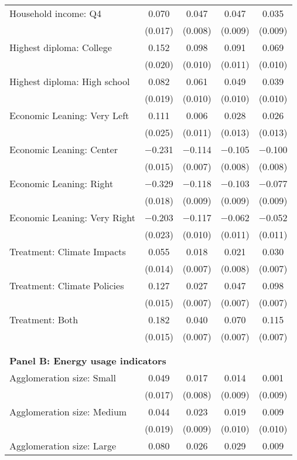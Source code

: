 \begin{tabular}{@{\extracolsep{5pt}}lcccc}
  Household income: Q4 & 0.070 & 0.047 & 0.047 & 0.035 \\ 
  & (0.017) & (0.008) & (0.009) & (0.009) \\ 
  Highest diploma: College & 0.152 & 0.098 & 0.091 & 0.069 \\ 
  & (0.020) & (0.010) & (0.011) & (0.010) \\ 
  Highest diploma: High school & 0.082 & 0.061 & 0.049 & 0.039 \\ 
  & (0.019) & (0.010) & (0.010) & (0.010) \\ 
  Economic Leaning: Very Left & 0.111 & 0.006 & 0.028 & 0.026 \\ 
  & (0.025) & (0.011) & (0.013) & (0.013) \\ 
  Economic Leaning: Center & $-$0.231 & $-$0.114 & $-$0.105 & $-$0.100 \\ 
  & (0.015) & (0.007) & (0.008) & (0.008) \\ 
  Economic Leaning: Right & $-$0.329 & $-$0.118 & $-$0.103 & $-$0.077 \\ 
  & (0.018) & (0.009) & (0.009) & (0.009) \\ 
  Economic Leaning: Very Right & $-$0.203 & $-$0.117 & $-$0.062 & $-$0.052 \\ 
  & (0.023) & (0.010) & (0.011) & (0.011) \\ 
  Treatment: Climate Impacts & 0.055 & 0.018 & 0.021 & 0.030 \\ 
  & (0.014) & (0.007) & (0.008) & (0.007) \\ 
  Treatment: Climate Policies & 0.127 & 0.027 & 0.047 & 0.098 \\ 
  & (0.015) & (0.007) & (0.007) & (0.007) \\ 
  Treatment: Both & 0.182 & 0.040 & 0.070 & 0.115 \\ 
  & (0.015) & (0.007) & (0.007) & (0.007) \\ 
 \\[1ex] \hline \\[1ex]
\multicolumn{ 5 }{l}{\textbf{ Panel B: Energy usage indicators }} \\
  Agglomeration size: Small & 0.049 & 0.017 & 0.014 & 0.001 \\ 
  & (0.017) & (0.008) & (0.009) & (0.009) \\ 
  Agglomeration size: Medium & 0.044 & 0.023 & 0.019 & 0.009 \\ 
  & (0.019) & (0.009) & (0.010) & (0.010) \\ 
  Agglomeration size: Large & 0.080 & 0.026 & 0.029 & 0.009 \\ 

\end{tabular}
